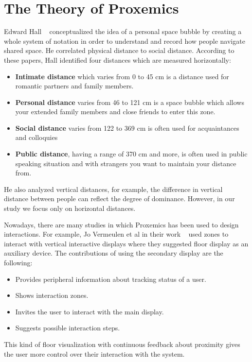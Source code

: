 \section{The Theory of Proxemics}
\label{sec:The Theory of Proxemics}
Edward Hall ~\cite{hall1966hidden,hall1963system} conceptualized the idea of a
personal space bubble by creating a whole system of notation in order to understand
and record how people navigate shared space.
He correlated physical distance to social distance.
According to these papers, Hall identified four distances which are measured horizontally:
\begin{itemize}
  \item \textbf{Intimate distance} which varies from 0 to 45 cm is a distance used for romantic partners and family members.
  \item \textbf{Personal distance} varies from 46 to 121 cm is a space bubble which allows your extended family
        members and close friends to enter this zone.
  \item \textbf{Social distance} varies from 122 to 369 cm is often used for acquaintances and colloquies
  \item \textbf{Public distance}, having a range of 370 cm and more, is often used in public speaking
        situation and with strangers you want to maintain your distance from.
\end{itemize}

He also analyzed vertical distances, for example, the difference in vertical distance
between people can reflect the degree of dominance.
However, in our study we focus only on horizontal distances.

Nowadays, there are many studies in which Proxemics has been used to design interactions.
For example, Jo Vermeulen et al in their work ~\cite{vermeulen2015proxemic} used zones to
interact with vertical interactive displays where they suggested floor display as an auxiliary device.
The contributions of using the secondary display are the following:
\begin{itemize}
    \item Provides peripheral information about tracking status of a user.
    \item Shows interaction zones.
    \item Invites the user to interact with the main display.
    \item Suggests possible interaction steps.
\end{itemize}
This kind of floor visualization with continuous feedback about proximity gives the user
more control over their interaction with the system.


